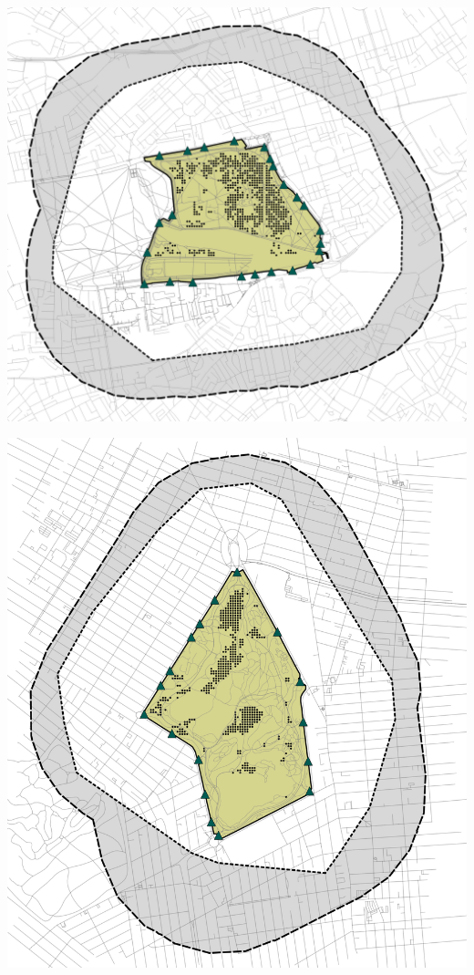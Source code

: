 \begin{multicols}{2}

\begin{minipage}{0.45\textwidth}
    \centering
    \includegraphics[width=\linewidth]{images/network/hyde_difference.png}\par\hspace{5pt} %
    \includegraphics[width=\linewidth]{images/network/prospect_difference.png}\par\hspace{5pt} %

\end{minipage}
\end{multicols}

